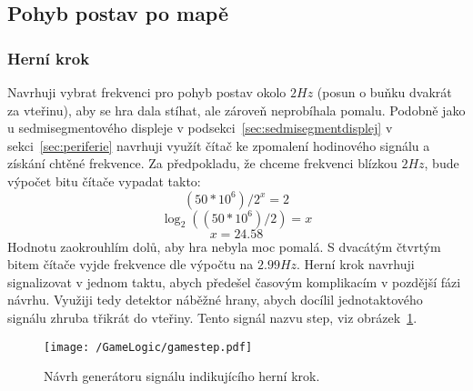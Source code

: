 \documentclass{report}
\begin{document}
\subsection{Pohyb postav po mapě}\label{sec:pohybpomape}
\subsubsection{Herní krok}
Navrhuji vybrat frekvenci pro pohyb postav okolo $2Hz$ (posun o buňku dvakrát za vteřinu), aby se hra dala stíhat, ale zároveň neprobíhala pomalu. Podobně jako u sedmisegmentového displeje v podsekci~\ref{sec:sedmisegmentdisplej} v sekci~\ref{sec:periferie} navrhuji využít čítač ke zpomalení hodinového signálu a získání chtěné frekvence. Za předpokladu, že chceme frekvenci blízkou $2Hz$, bude výpočet bitu čítače vypadat takto:
\[(50*10^6)/2^x=2\]
\[\log_2  ((50*10^6)/2) = x\]
\[x = 24.58\]
Hodnotu zaokrouhlím dolů, aby hra nebyla moc pomalá. S dvacátým čtvrtým bitem čítače vyjde frekvence dle výpočtu na $2.99Hz$. Herní krok navrhuji signalizovat v jednom taktu, abych předešel časovým komplikacím v pozdější fázi návrhu. Využiji tedy detektor náběžné hrany, abych docílil jednotaktového signálu zhruba třikrát do vteřiny. Tento signál nazvu step, viz obrázek~\ref{fig:gamestep}.
\begin{figure}
\centering
\texttt{[image: /GameLogic/gamestep.pdf]}
\caption{Návrh generátoru signálu indikujícího herní krok.}
\label{fig:gamestep}
\end{figure}
\end{document}
